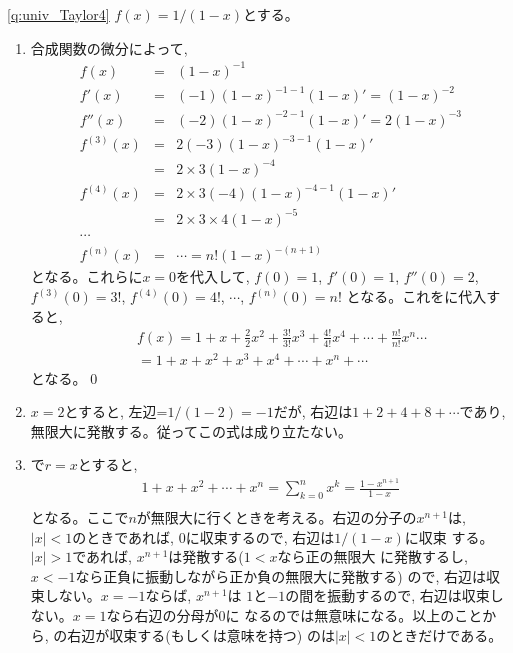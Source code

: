 \ref{q:univ_Taylor4} $f(x)=1/(1-x)$とする。
\begin{enumerate}
\item 合成関数の微分によって, 
\begin{eqnarray*}
f(x)&=&(1-x)^{-1}\\
f'(x)&=&(-1)(1-x)^{-1-1}(1-x)'=(1-x)^{-2}\\
f''(x)&=&(-2)(1-x)^{-2-1}(1-x)'=2(1-x)^{-3}\\
f^{(3)}(x)&=&2(-3)(1-x)^{-3-1}(1-x)'\\
&=&2\times3(1-x)^{-4}\\
f^{(4)}(x)&=&2\times3(-4)(1-x)^{-4-1}(1-x)'\\
&=&2\times3\times4(1-x)^{-5}\\
\cdots\\
f^{(n)}(x)&=&\cdots=n!(1-x)^{-(n+1)}
\end{eqnarray*}
となる。これらに$x=0$を代入して, 
$f(0)=1$, $f'(0)=1$, $f''(0)=2$, $f^{(3)}(0)=3!$, $f^{(4)}(0)=4!$, $\cdots$, $f^{(n)}(0)=n!$
となる。これをに代入すると, 
\begin{eqnarray*}
&&f(x)=1+x+\frac{2}{2}x^2+\frac{3!}{3!}x^3+\frac{4!}{4!}x^4+\cdots+\frac{n!}{n!}x^n\cdots\\
&&=1+x+x^2+x^3+x^4+\cdots+x^n+\cdots
\end{eqnarray*}
となる。\qed
\item $x=2$とすると, 左辺=$1/(1-2)=-1$だが, 右辺は$1+2+4+8+\cdots$であり, 
無限大に発散する。従ってこの式は成り立たない。
\item {}で$r=x$とすると, 
\begin{eqnarray}
1+x+x^2+\cdots+x^n=\sum_{k=0}^n x^k=\frac{1-x^{n+1}}{1-x}\nonumber\\\label{eq:univ_Taylor44}
\end{eqnarray}
となる。ここで$n$が無限大に行くときを考える。右辺の分子の$x^{n+1}$は, 
$|x|<1$のときであれば, 0に収束するので, 右辺は$1/(1-x)$に収束
する。$|x|>1$であれば, $x^{n+1}$は発散する($1<x$なら正の無限大
に発散するし, $x<-1$なら正負に振動しながら正か負の無限大に発散する)
ので, 右辺は収束しない。$x=-1$ならば, $x^{n+1}$は
$1$と$-1$の間を振動するので, 右辺は収束しない。$x=1$なら右辺の分母が0に
なるのでは無意味になる。以上のことから, 
の右辺が収束する(もしくは意味を持つ)
のは$|x|<1$のときだけである。
\end{enumerate}
\mv

